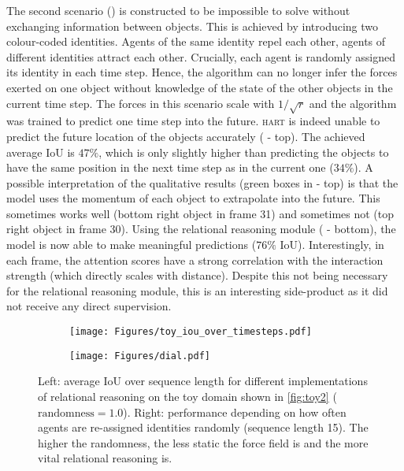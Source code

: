 The second scenario () is constructed to be impossible to solve without exchanging information between objects. This is achieved by introducing two colour-coded identities. Agents of the same identity repel each other, agents of different identities attract each other. Crucially, each agent is randomly assigned its identity in each time step. Hence, the algorithm can no longer infer the forces exerted on one object without knowledge of the state of the other objects in the current time step. The forces in this scenario scale with $1/\sqrt{r}$ and the algorithm was trained to predict one time step into the future. \textsc{hart} is indeed unable to predict the future location of the objects accurately ( - top). The achieved average IoU is $47\%$, which is only slightly higher than predicting the objects to have the same position in the next time step as in the current one ($34\%$). A possible interpretation of the qualitative results (green boxes in  - top) is that the model uses the momentum of each object to extrapolate into the future. This sometimes works well (bottom right object in frame 31) and sometimes not (top right object in frame 30). Using the relational reasoning module ( - bottom), the model is now able to make meaningful predictions ($76\%$ IoU). Interestingly, in each frame, the attention scores have a strong correlation with the interaction strength (which directly scales with distance). Despite this not being necessary for the relational reasoning module, this is an interesting side-product as it did not receive any direct supervision.

\begin{figure}
    \centering
    \begin{subfigure}[c]{0.49\linewidth}
        \centering
        \texttt{[image: Figures/toy\_iou\_over\_timesteps.pdf]}
    \end{subfigure}
    \begin{subfigure}[c]{0.49\linewidth}
        \centering
        \texttt{[image: Figures/dial.pdf]}
    \end{subfigure}
    \vspace{-2mm}
    \caption{
        Left: average IoU over sequence length for different implementations of relational reasoning on the toy domain shown in \cref{fig:toy2} ($\text{randomness} = 1.0$). Right: performance depending on how often agents are re-assigned identities randomly (sequence length 15). The higher the randomness, the less static the force field is and the more vital relational reasoning is. 
        \vspace{-4mm}
    }
    \label{fig:toy_quant}
\end{figure}

